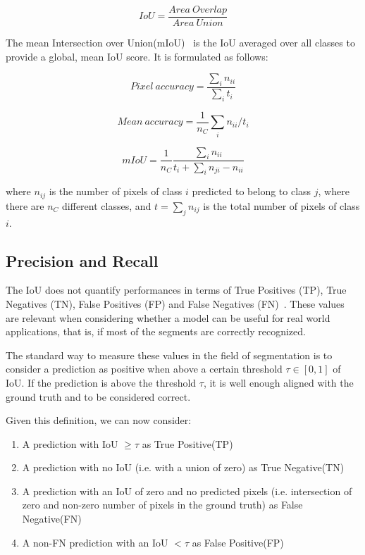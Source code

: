\documentclass[oneside, english, bibtex]{kththesis}
\begin{document}
\begin{equation}
    IoU = \frac{Area \: Overlap}{Area \: Union}
    \label{eqn:iou}
\end{equation}

The mean Intersection over Union(mIoU)~\cite{DBLP:journals/corr/LongSD14} is the IoU averaged over all classes to provide a global, mean IoU score. It is formulated as follows:

\begin{equation}
    Pixel \: accuracy = \frac{\sum_{i} n_{ii}}{\sum_{i}t_i}
    \label{eqn:pixelacc}
\end{equation}

\begin{equation}
    Mean \: accuracy = \frac{1}{n_C} \sum_{i} n_{ii} / t_i
    \label{eqn:meanacc}
\end{equation}

\begin{equation}
    mIoU = \frac{1}{n_C} \frac{\sum_{i} n_{ii}}{t_i + \sum_{i} n_{ji} - n_{ii}}
    \label{eqn:meanIoU}
\end{equation}

where $n_{ij}$ is the number of pixels of class $i$ predicted to belong to class $j$, where there are $n_{C}$ different classes, and $t = \sum_{j} n_{ij}$ is the total number of pixels of class $i$.

\subsection{Precision and Recall}

The IoU does not quantify performances in terms of True Positives (TP), True Negatives (TN), False Positives (FP) and False Negatives (FN)~\cite{davis2006relationship}. These values are relevant when considering whether a model can be useful for real world applications, that is, if most of the segments are correctly recognized.

The standard way to measure these values in the field of segmentation is to consider a prediction as positive when above a certain threshold $\tau \in [0,1]$ of IoU. If the prediction is above the threshold $\tau$, it is well enough aligned with the ground truth and to be considered correct.

Given this definition, we can now consider:
\begin{enumerate}
\item A prediction with IoU $\geq \tau$ as True Positive(TP)
\item A prediction with no IoU (i.e. with a union of zero) as True Negative(TN)
\item A prediction with an IoU of zero and no predicted pixels (i.e. intersection of zero and non-zero number of pixels in the ground truth) as False Negative(FN)
\item A non-FN prediction with an IoU $< \tau$ as False Positive(FP)
\end{enumerate}
\end{document}
